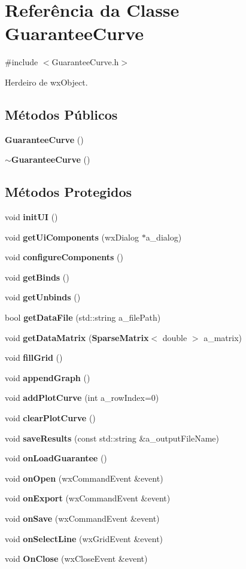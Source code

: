 \section{Referência da Classe Guarantee\+Curve}
\label{class_guarantee_curve}


{\ttfamily \#include $<$Guarantee\+Curve.\+h$>$}



Herdeiro de wx\+Object.

\subsection*{Métodos Públicos}
\begin{DoxyCompactItemize}
\item 
{\bf Guarantee\+Curve} ()
\item 
{\bf $\sim$\+Guarantee\+Curve} ()
\end{DoxyCompactItemize}
\subsection*{Métodos Protegidos}
\begin{DoxyCompactItemize}
\item 
void {\bf init\+UI} ()
\item 
void {\bf get\+Ui\+Components} (wx\+Dialog $\ast$a\+\_\+dialog)
\item 
void {\bf configure\+Components} ()
\item 
void {\bf get\+Binds} ()
\item 
void {\bf get\+Unbinds} ()
\item 
bool {\bf get\+Data\+File} (std\+::string a\+\_\+file\+Path)
\item 
void {\bf get\+Data\+Matrix} ({\bf Sparse\+Matrix}$<$ double $>$ a\+\_\+matrix)
\item 
void {\bf fill\+Grid} ()
\item 
void {\bf append\+Graph} ()
\item 
void {\bf add\+Plot\+Curve} (int a\+\_\+row\+Index=0)
\item 
void {\bf clear\+Plot\+Curve} ()
\item 
void {\bf save\+Results} (const std\+::string \&a\+\_\+output\+File\+Name)
\item 
void {\bf on\+Load\+Guarantee} ()
\item 
void {\bf on\+Open} (wx\+Command\+Event \&event)
\item 
void {\bf on\+Export} (wx\+Command\+Event \&event)
\item 
void {\bf on\+Save} (wx\+Command\+Event \&event)
\item 
void {\bf on\+Select\+Line} (wx\+Grid\+Event \&event)
\item 
void {\bf On\+Close} (wx\+Close\+Event \&event)
\end{DoxyCompactItemize}
